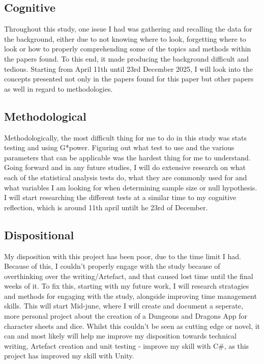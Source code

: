 \documentclass[conference]{IEEEtran}
\begin{document}
\subsection{Cognitive}
Throughout this study, one issue I had was gathering and recalling the data for the background, either due to not knowing where to look, forgetting where to look or how to properly comprehending some of the topics and methods within the papers found. To this end, it made producing the background difficult and tedious. Starting from April 11th until 23rd December 2025, I will look into the concepts presented not only in the papers found for this paper but other papers as well in regard to methodologies. 

\subsection{Methodological}
Methodologically, the most difficult thing for me to do in this study was stats testing and using G*power. Figuring out what test to use and the various parameters that can be applicable was the hardest thing for me to understand. Going forward and in any future studies, I will do extensive research on what each of the statistical analysis tests do, what they are commonly used for and what variables I am looking for when determining sample size or null hypothesis. I will start researching the different tests at a similar time to my cognitive reflection, which is around 11th april untilt he 23rd of December.

\subsection{Dispositional}
My disposition with this project has been poor, due to the time limit I had. Because of this, I couldn't properly engage with the study because of overthinking over the writing/Artefact, and that caused lost time until the final weeks of it. To fix this, starting with my future work, I will research stratagies and methods for engaging with the study, alongside improving time management skills.  This will start Mid-june, where I will create and document a seperate, more personal project about the creation of a Dungeons and Dragons App for character sheets and dice. Whilst this couldn't be seen as cutting edge or novel, it can and most likely will help me improve my disposition towards technical writing, Artefact creation and unit testing - improve my skill with C\#, as this project has improved my skill with Unity.
\end{document}
